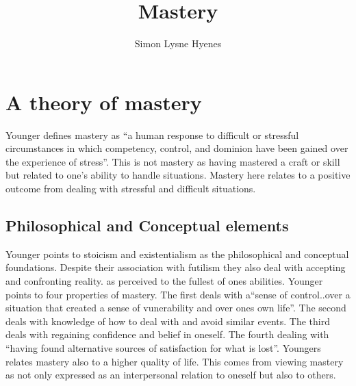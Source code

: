 \documentclass[11pt,UKenglish, a4paper]{article}
\author{Simon Lysne Hyenes}
\title{Mastery}
\begin{document}

\section{A theory of mastery}
Younger defines mastery as ``a human response to difficult or stressful circumstances in which competency, control, and dominion have been gained over the experience of stress''\cite[p.76]{Younger1991Theory}. This is not mastery as having mastered a craft or skill but related to one's ability to handle situations. Mastery here relates to a positive outcome from dealing with stressful and difficult situations. 

\subsection{Philosophical and Conceptual elements}
Younger points to stoicism and existentialism as the philosophical and conceptual foundations. Despite their association with futilism they also deal with accepting and confronting reality. as perceived to the fullest of ones abilities. 
Younger points to four properties of mastery. The first deals with a``sense of control..over a situation that created a sense of vunerability and over ones own life''\cite[p.81]{Younger1991Theory}. The second deals with knowledge of how to deal with and avoid similar events. The third deals with regaining confidence and belief in oneself. The fourth dealing with ``having found alternative sources of satisfaction for what is lost''\cite[p.81]{Younger1991Theory}. Youngers relates mastery also to a higher quality of life. This comes from viewing mastery as not only expressed as an interpersonal relation to oneself but also to others. 
\end{document}
